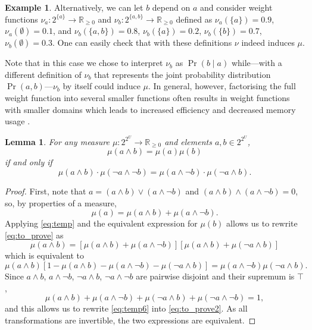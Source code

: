 \documentclass{article}
\newtheorem{lemma}{Lemma}
\theoremstyle{definition}
\newtheorem{example}{Example}
\theoremstyle{remark}
\begin{document}
{\begin{example}
  Alternatively, we can let $b$ depend on $a$ and consider weight functions
  $\nu_a\colon 2^{\{a\}} \to \mathbb{R}_{\ge 0}$ and $\nu_b\colon 2^{\{a, b\}}
  \to \mathbb{R}_{\ge 0}$ defined as $\nu_a(\{a\}) = 0.9$, $\nu_a(\emptyset) =
  0.1$, and $\nu_b(\{a, b\}) = 0.8$, $\nu_b(\{a\}) = 0.2$, $\nu_b(\{b\}) = 0.7$,
  $\nu_b(\emptyset) = 0.3$. One can easily check that with these definitions
  $\nu$ indeed induces $\mu$.
\end{example}

Note that in this case we chose to interpret $\nu_b$ as $\Pr(b \mid a)$
while---with a different definition of $\nu_b$ that represents the joint
probability distribution $\Pr(a, b)$---$\nu_b$ by itself could induce $\mu$. In
general, however, factorising the full weight function into several smaller
functions often results in weight functions with smaller domains which leads to
increased efficiency and decreased memory usage \cite{DBLP:conf/aaai/DudekPV20}.

\begin{lemma} \label{lemma:before_theorem}
  For any measure $\mu\colon 2^{2^U} \to \mathbb{R}_{\ge 0}$ and elements $a, b
  \in 2^{2^U}$,
  \begin{equation} \label{eq:to_prove}
    \mu(a \land b) = \mu(a)\mu(b)
  \end{equation}
  if and only if
  \begin{equation} \label{eq:to_prove2}
    \mu(a \land b) \cdot \mu(\neg a \land \neg b) = \mu(a \land \neg b)
    \cdot \mu(\neg a \land b).
  \end{equation}
\end{lemma}
\begin{proof}
  First, note that $a = (a \land b) \lor (a \land \neg b)$ and $(a \land b)
  \land (a \land \neg b) = 0$, so, by properties of a measure,
  \begin{equation} \label{eq:temp}
    \mu(a) = \mu(a \land b) + \mu(a \land \neg b).
  \end{equation}
  Applying \cref{eq:temp} and the equivalent expression for $\mu(b)$ allows us
  to rewrite \cref{eq:to_prove} as
  \[
    \mu(a \land b) = [\mu(a \land b) + \mu(a \land \neg b)][\mu(a \land b) +
    \mu(\neg a \land b)]
  \]
  which is equivalent to
  \begin{equation} \label{eq:temp6}
    \mu(a \land b)[1 - \mu(a \land b) - \mu(a \land \neg b) - \mu(\neg a \land b)] = \mu(a \land \neg b)\mu(\neg a \land b).
  \end{equation}
  Since $a \land b$, $a \land \neg b$, $\neg a \land b$, $\neg a \land \neg b$
  are pairwise disjoint and their supremum is $\top$,
  \[
    \mu(a \land b) + \mu(a \land \neg b) + \mu(\neg a \land b) + \mu(\neg a
    \land \neg b) = 1,
  \]
  and this allows us to rewrite \cref{eq:temp6} into \cref{eq:to_prove2}. As all
  transformations are invertible, the two expressions are equivalent.
\end{proof}

}
\end{document}
